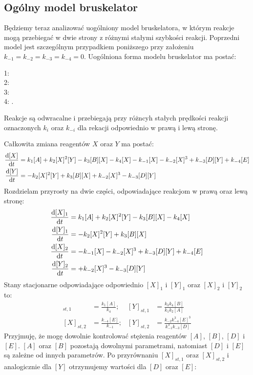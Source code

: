 \documentclass[10pt, a4paper, twoside, onecolumn]{article}
\numberwithin{equation}{section}
\begin{document}
	\subsection{Ogólny model bruskelator}
	Będziemy teraz analizować uogólniony model bruskelatora, w którym reakcje mogą przebiegać w dwie strony z różnymi stałymi szybkości reakcji. Poprzedni model jest szczególnym przypadkiem poniższego przy założeniu \(k_{-1}=k_{-2}=k_{-3}=k_{-4}=0\). 
	Uogólniona forma modelu bruskelator ma postać:
	\begin{center}
		1:  \\
		2:  \\
		3:  \\
		4: .
	\end{center}
	Reakcje są odwracalne i przebiegają przy różncyh stałych prędkości reakcji oznaczonych \(k_{i}\) oraz \(k_{-i}\) dla rekacji odpowiednio w prawą i lewą stronę. \par
	Całkowita zmiana reagentów \(X\) oraz \(Y\) ma postać:
	\begin{align}
		\dv{[X]}{t} &= k_{1}[A] + k_{2}[X]^{2}[Y] - k_{3}[B][X] - k_{4}[X] - k_{-1}[X] - k_{-2}[X]^{3} + k_{-3}[D][Y] + k_{-4}[E] \\
		\dv{[Y]}{t} &= - k_{2}[X]^{2}[Y] + k_{3}[B][X] + k_{-2}[X]^{3} - k_{-3}[D][Y]
	\end{align}
	Rozdzielam przyrosty na dwie części, odpowiadające reakcjom w prawą oraz lewą stronę:
	\begin{align}
		\dv{[X]_{1}}{t} &= k_{1}[A] + k_{2}[X]^{2}[Y] - k_{3}[B][X] - k_{4}[X] \\
		\dv{[Y]_{1}}{t} &= - k_{2}[X]^{2}[Y] + k_{3}[B][X] \\
		\dv{[X]_{2}}{t} &= - k_{-1}[X] - k_{-2}[X]^{3} + k_{-3}[D][Y] + k_{-4}[E] \\
		\dv{[Y]_{2}}{t} &= + k_{-2}[X]^{3} - k_{-3}[D][Y]
	\end{align}
	Stany stacjonarne odpowiadające odpowiednio \([X]_{1}\) i \([Y]_{1}\) oraz \([X]_{2}\) i \([Y]_{2}\) to:
	\begin{align}
		[X]_{st, 1} &= \frac{k_{1}[A]}{k_{4}}; & [Y]_{st, 1} &= \frac{k_{3}k_{4}[B]}{k_{1}k_{2}[A]} \\
		[X]_{st, 2} &= \frac{k_{-4}[E]}{k_{-1}}; & [Y]_{st, 2} &= \frac{k_{-2}k_{-4}^{3}[E]^{3}}{k_{-1}^{3}k_{-3}[D]}
	\end{align}
	Przyjmuję, że mogę dowolnie kontrolować stężenia reagentów \([A]\), \([B]\), \([D]\) i \([E]\). \([A]\) oraz \([B]\) pozostają dowolnymi parametrami, natomiast \([D]\) i \([E]\) są zależne od innych parametrów. Po przyrównaniu \([X]_{st, 1}\) oraz \([X]_{st, 2}\) i analogicznie dla \([Y]\) otrzymujemy wartości dla \([D]\) oraz \([E]\):
\end{document}
